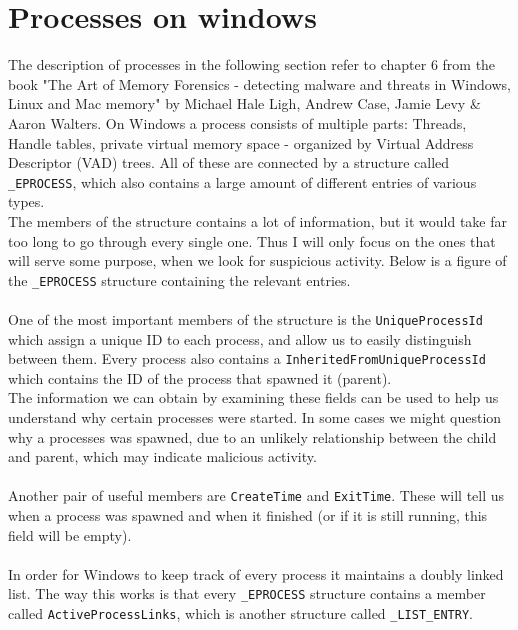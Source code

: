 \documentclass[a4paper]{article}
\begin{document}
\newpage
\section{Processes on windows}

The description of processes in the following section refer to chapter 6 from the book "The Art of Memory Forensics - detecting malware and threats in Windows, Linux and Mac memory" 
by Michael Hale Ligh, Andrew Case, Jamie Levy & Aaron Walters.
%
On Windows a process consists of multiple parts: Threads, Handle tables, private virtual memory space - organized by Virtual Address Descriptor (VAD) trees. 
All of these are connected by a structure called \texttt{\_EPROCESS}, which also contains a large amount of different entries of various types. \\
%
The members of the structure contains a lot of information, but it would take far too long to go through every single one. Thus I will only focus on the ones that will serve some purpose, when we look for suspicious activity. 
Below is a figure of the \texttt{\_EPROCESS} structure containing the relevant entries. \\\\
%
%
One of the most important members of the structure is the \texttt{UniqueProcessId} which assign a unique ID to each process, and allow us to easily distinguish between them. 
Every process also contains a \texttt{InheritedFromUniqueProcessId} which contains the ID of the process that spawned it (parent). \\
The information we can obtain by examining these fields can be used to help us understand why certain processes were started. In some cases we might question why a processes was spawned, 
due to an unlikely relationship between the child and parent, which may indicate malicious activity. \\\\
%
Another pair of useful members are \texttt{CreateTime} and \texttt{ExitTime}. These will tell us when a process was spawned and when it finished (or if it is still running, this field will be empty). \\\\
%
In order for Windows to keep track of every process it maintains a doubly linked list. The way this works is that every \texttt{\_EPROCESS} structure contains a member called \texttt{ActiveProcessLinks}, 
which is another structure called \texttt{\_LIST\_ENTRY}.
\end{document}
